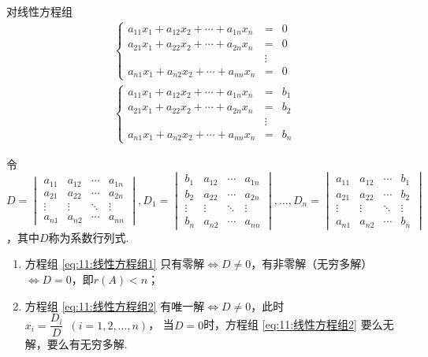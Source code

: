 \begin{theorem}  \label{thm:11:Cramer}
    对线性方程组
    \begin{gather}
        \label{eq:11:线性方程组1}
        \left\{ \begin{array}{rcl}
            a_{11}x_1+a_{12}x_2+\cdots+a_{1n}x_n&=&0 \\
            a_{21}x_1+a_{22}x_2+\cdots+a_{2n}x_n&=&0 \\
            &\vdots& \\
            a_{n1}x_1+a_{n2}x_2+\cdots+a_{nn}x_n&=&0
        \end{array} \right.
        \\
        \label{eq:11:线性方程组2}
        \left\{ \begin{array}{rcl}
            a_{11}x_1+a_{12}x_2+\cdots+a_{1n}x_n&=&b_1 \\
            a_{21}x_1+a_{22}x_2+\cdots+a_{2n}x_n&=&b_2 \\
            &\vdots& \\
            a_{n1}x_1+a_{n2}x_2+\cdots+a_{nn}x_n&=&b_n
        \end{array} \right.
    \end{gather}

    令$D=\begin{vmatrix}
        a_{11} & a_{12} & \cdots & a_{1n} \\
        a_{21} & a_{22} & \cdots & a_{2n} \\
        \vdots & \vdots & \ddots & \vdots \\
        a_{n1} & a_{n2} & \cdots & a_{nn}
    \end{vmatrix},D_1=\begin{vmatrix}
        b_1 & a_{12} & \cdots & a_{1n} \\
        b_2 & a_{22} & \cdots & a_{2n} \\
        \vdots & \vdots & \ddots & \vdots \\
        b_n & a_{n2} & \cdots & a_{nn}
    \end{vmatrix},\ldots,D_n=\begin{vmatrix}
        a_{11} & a_{12} & \cdots & b_1 \\
        a_{21} & a_{22} & \cdots & b_2 \\
        \vdots & \vdots & \ddots & \vdots \\
        a_{n1} & a_{n2} & \cdots & b_n
    \end{vmatrix}$，其中$D$称为系数行列式.
    \begin{enumerate}
        \item 方程组 \ref{eq:11:线性方程组1} 只有零解$\iff D \neq 0$，有非零解（无穷多解）$\iff D=0$，即$r(A)<n$；

        \item 方程组 \ref{eq:11:线性方程组2} 有唯一解$\iff D \neq 0$，此时$x_i=\dfrac{D_i}{D}\enspace(i=1,2,\ldots,n)$，
        当$D=0$时，方程组 \ref{eq:11:线性方程组2} 要么无解，要么有无穷多解.
    \end{enumerate}
\end{theorem}
